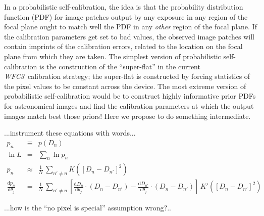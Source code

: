 \documentclass[12pt]{article}
\newcommand{\project}[1]{\textsl{#1}}
\newcommand{\WFC}{\project{WFC3}}
\newcommand{\dd}{\mathrm{d}}
\begin{document}
In a probabilistic self-calibration, the idea is that the probability
distribution function (PDF) for image patches output by any exposure
in any region of the focal plane ought to match well the PDF in any
\emph{other} region of the focal plane.  If the calibration parameters
get set to bad values, the observed image patches will contain
imprints of the calibration errors, related to the location on the
focal plane from which they are taken.  The simplest version of
probabilistic self-calibration is the construction of the
``super-flat'' in the current \WFC\ calibration strategy; the
super-flat is constructed by forcing statistics of the pixel values to
be constant across the device.  The most extreme version of
probabilistic self-calibration would be to construct highly
informative prior PDFs for astronomical images and find the
calibration parameters at which the output images match best those
priors!  Here we propose to do something intermediate.

...instrument these equations with words...
\begin{eqnarray}
p_n &\equiv& p(D_n)
\\
\ln L &=& \sum_n \ln p_n
\\
p_n &\approx& \frac{1}{N}\,\sum_{n'\neq n} K([D_n - D_{n'}]^2)
\\
\frac{\dd p_n}{\dd \theta_j} &=& \frac{1}{N}\,\sum_{n'\neq n} \left[
  \frac{\dd D_n}{\dd \theta_j}\cdot(D_n - D_{n'})
 -\frac{\dd D_{n'}}{\dd \theta_j}\cdot(D_n - D_{n'})
  \right]\,K'([D_n - D_{n'}]^2)
\end{eqnarray}

...how is the ``no pixel is special'' assumption wrong?..

%
%
\describearchival       %


%
%
\budgetnarrative       %
\end{document}
